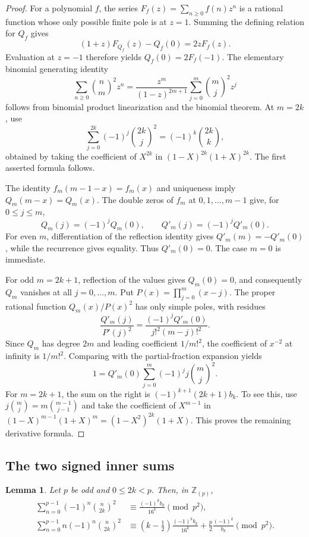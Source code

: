 \documentclass[11pt,a4paper]{article}
\numberwithin{equation}{section}
\newtheorem{lemma}[theorem]{Lemma}
\theoremstyle{remark}
\begin{document}
\begin{proof}
For a polynomial $f$, the series
$F_f(z)=\sum_{n\ge0}f(n)z^n$ is a rational function whose only
possible finite pole is at $z=1$. Summing the defining relation for
$Q_f$ gives
\[
 (1+z)F_{Q_f}(z)-Q_f(0)=2zF_f(z).
\]
Evaluation at $z=-1$ therefore yields $Q_f(0)=2F_f(-1)$.
The elementary binomial generating identity
\[
 \sum_{n\ge0}\binom nm^2z^n
 =\frac{z^m}{(1-z)^{2m+1}}
    \sum_{j=0}^m\binom mj^2z^j
\]
follows from binomial product linearization and the binomial
theorem. At $m=2k$, use
\[
 \sum_{j=0}^{2k}(-1)^j\binom{2k}j^2=(-1)^k\binom{2k}k,
\]
obtained by taking the coefficient of $X^{2k}$ in
$(1-X)^{2k}(1+X)^{2k}$. The first asserted formula follows.

The identity $f_m(m-1-x)=f_m(x)$ and uniqueness imply
$Q_m(m-x)=Q_m(x)$. The double zeros of $f_m$ at
$0,1,\ldots,m-1$ give, for $0\le j\le m$,
\[
 Q_m(j)=(-1)^jQ_m(0),\qquad
 Q'_m(j)=(-1)^jQ'_m(0).
\]
For even $m$, differentiation of the reflection identity gives
$Q'_m(m)=-Q'_m(0)$, while the recurrence gives equality.
Thus $Q'_m(0)=0$. The case $m=0$ is immediate.

For odd $m=2k+1$, reflection of the values gives $Q_m(0)=0$,
and consequently $Q_m$ vanishes at all $j=0,\ldots,m$. Put
$P(x)=\prod_{j=0}^m(x-j)$. The proper rational function
$Q_m(x)/P(x)^2$ has only simple poles, with residues
\[
 \frac{Q'_m(j)}{P'(j)^2}
 =\frac{(-1)^jQ'_m(0)}{j!^2(m-j)!^2}.
\]
Since $Q_m$ has degree $2m$ and leading coefficient $1/m!^2$,
the coefficient of $x^{-2}$ at infinity is $1/m!^2$. Comparing
with the partial-fraction expansion yields
\[
 1=Q'_m(0)\sum_{j=0}^m(-1)^j j\binom mj^2.
\]
For $m=2k+1$, the sum on the right is
$(-1)^{k+1}(2k+1)b_k$. To see this, use
$j\binom mj=m\binom{m-1}{j-1}$ and take the coefficient of
$X^{m-1}$ in
$(1-X)^{m-1}(1+X)^m=(1-X^2)^{2k}(1+X)$.
This proves the remaining derivative formula.
\end{proof}

\subsection{The two signed inner sums}

\begin{lemma}\label{lem:signed-inner-sums}
Let $p$ be odd and $0\le2k<p$. Then, in $\mathbb Z_{(p)}$,
\begin{align*}
 \sum_{n=0}^{p-1}(-1)^n\binom n{2k}^{\!2}
 &\equiv\frac{(-1)^k b_k}{16^k}\pmod{p^2},\\
 \sum_{n=0}^{p-1}n(-1)^n\binom n{2k}^{\!2}
 &\equiv\left(k-\frac12\right)\frac{(-1)^k b_k}{16^k}
       +\frac p2\frac{(-1)^k}{b_k}\pmod{p^2}.
\end{align*}
\end{lemma}
\end{document}
